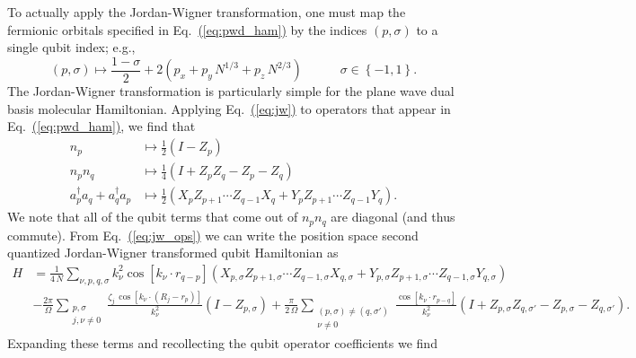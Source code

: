 \documentclass[superscriptaddress,aps,pra,nofootinbib,notitlepage,10pt,longbibliography]{revtex4-1}
\newcommand{\eq}[1]{Eq.~\hyperref[eq:#1]{(\ref*{eq:#1})}}
\begin{document}
To actually apply the Jordan-Wigner transformation, one must map the fermionic orbitals specified in \eq{pwd_ham} by the indices $(p, \sigma)$ to a single qubit index; e.g.,
\begin{equation}
\left(p, \sigma\right) \mapsto \frac{1 - \sigma}{2} + 2 \left(p_x + p_y\, N^{1/3} + p_z \, N^{2/3}\right)
\quad \quad \quad
\sigma \in \left\{-1, 1\right\}.
\end{equation}
The Jordan-Wigner transformation is particularly simple for the plane wave dual basis molecular Hamiltonian. Applying \eq{jw} to operators that appear in \eq{pwd_ham}, we find that
\begin{align}
\label{eq:jw_ops}
n_p & \mapsto \frac{1}{2} \left(I - Z_p\right)\\
n_{p} n_{q} & \mapsto  \frac{1}{4} \left(I + Z_{p} Z_{q} - 
Z_{p} - Z_{q} \right)\nonumber\\
%
a^\dagger_{p} a_{q} + a^\dagger_{q} a_{p} & \mapsto \frac{1}{2} \left(X_{p} Z_{p + 1} \cdots Z_{q - 1} X_{q} + Y_{p} Z_{p + 1} \cdots Z_{q - 1} Y_{q}\right) \nonumber.
\end{align}
We note that all of the qubit terms that come out of $n_p n_q$ are diagonal (and thus commute). From \eq{jw_ops} we can write the position space second quantized Jordan-Wigner transformed qubit Hamiltonian as
\begin{align}
H & = \frac{1}{4\, N} \sum_{\nu, p, q, \sigma} k_\nu^2 \cos \left[k_\nu \cdot r_{q - p} \right] \left(X_{p,\sigma} Z_{p + 1,\sigma} \cdots Z_{q - 1,\sigma} X_{q,\sigma} + Y_{p,\sigma} Z_{p + 1,\sigma} \cdots Z_{q - 1,\sigma} Y_{q,\sigma} \right)\\
%
& - \frac{2 \pi}{\Omega} \sum_{\substack{p,\sigma \\ j, \nu\neq 0}} \frac{\zeta_j \, \cos\left[ k_{\nu} \cdot \left(R_j - r_{p}\right)\right] }{k_\nu^2}\left(I - Z_{p,\sigma}\right) + \frac{\pi}{2\,\Omega } \sum_{\substack{(p, \sigma) \neq (q, \sigma') \\ \nu \neq 0}} \frac{\cos \left[k_\nu \cdot r_{p-q}\right]}{k_\nu^2} \left(I + Z_{p,\sigma} Z_{q,\sigma'} - 
Z_{p,\sigma} - Z_{q,\sigma'} \right).\nonumber
\end{align}
Expanding these terms and recollecting the qubit operator coefficients we find
\end{document}
